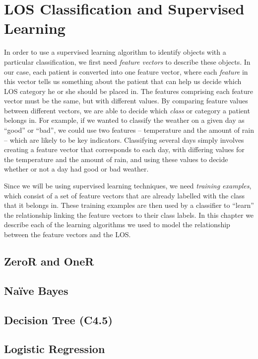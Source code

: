 \chapter{LOS Classification and Supervised Learning}
  \label{chap:classification}

In order to use a supervised learning algorithm to identify objects with
a particular classification, we first need \textit{feature vectors} to
describe these objects. In our case, each patient is converted into one
feature vector, where each \textit{feature} in this vector tells us
something about the
patient that can help us decide which LOS category he or she should be
placed in. The features comprising each feature vector must be the same,
but with different values. By comparing feature values between different
vectors, we are able to decide which \textit{class} or category a patient
belongs in. For example, if we wanted to classify the weather on a given
day as ``good'' or ``bad'', we could use two features -- temperature and
the amount of rain -- which are likely to be key indicators. Classifying
several days simply involves creating a feature vector that corresponds
to each day, with differing values for the temperature and the amount of
rain, and using these values to decide whether or not a day had good or
bad weather.

Since we will be using supervised learning techniques, we need
\textit{training examples}, which consist of a set of feature vectors
that are already labelled with the class that it belongs in. These
training examples are then used by a classifier to ``learn'' the
relationship linking the feature vectors to their class labels. In this
chapter we describe each of the learning algorithms we used to model the
relationship between the feature vectors and the LOS.

\section{ZeroR and OneR}

\section{Na\"{i}ve Bayes}

\section{Decision Tree (C4.5)}

\section{Logistic Regression}

